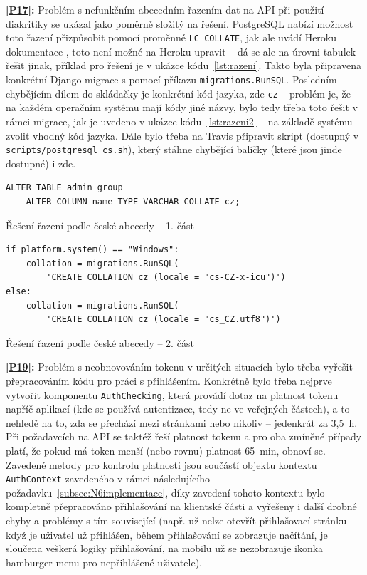 \textbf{\ref{P17}:} Problém s nefunkčním abecedním řazením dat na API při použití diakritiky se ukázal jako poměrně složitý na řešení. PostgreSQL nabízí možnost toto řazení přizpůsobit pomocí proměnné \verb|LC_COLLATE|, jak ale uvádí Heroku dokumentace \cite{heroku-razeni}, toto není možné na Heroku upravit -- dá se ale na úrovni tabulek řešit jinak, příklad pro řešení je v ukázce kódu~\ref{lst:razeni}. Takto byla připravena konkrétní Django migrace s pomocí příkazu \verb|migrations.RunSQL|. Posledním chybějícím dílem do skládačky je konkrétní kód jazyka, zde \verb|cz| -- problém je, že na každém operačním systému mají kódy jiné názvy, bylo tedy třeba toto řešit v rámci migrace, jak je uvedeno v ukázce kódu~\ref{lst:razeni2} -- na základě systému zvolit vhodný kód jazyka. Dále bylo třeba na Travis připravit skript (dostupný v \verb|scripts/postgresql_cs.sh|), který stáhne chybějící balíčky (které jsou jinde dostupné) i zde.

\begin{listing}[ht]
	\begin{verbatim}
ALTER TABLE admin_group
    ALTER COLUMN name TYPE VARCHAR COLLATE cz;
	\end{verbatim}
	\caption{Řešení řazení podle české abecedy -- 1. část}\label{lst:razeni}
\end{listing}

\begin{listing}[ht]
	\begin{verbatim}
if platform.system() == "Windows":
    collation = migrations.RunSQL(
        'CREATE COLLATION cz (locale = "cs-CZ-x-icu")')
else:
    collation = migrations.RunSQL(
        'CREATE COLLATION cz (locale = "cs_CZ.utf8")')
	\end{verbatim}
	\caption{Řešení řazení podle české abecedy -- 2. část}\label{lst:razeni2}
\end{listing}

\textbf{\ref{P19}:} Problém s neobnovováním tokenu v určitých situacích bylo třeba vyřešit přepracováním kódu pro práci s přihlášením. Konkrétně bylo třeba nejprve vytvořit komponentu \verb|AuthChecking|, která provádí dotaz na platnost tokenu napříč aplikací (kde se používá autentizace, tedy ne ve veřejných částech), a to nehledě na to, zda se přechází mezi stránkami nebo nikoliv -- jedenkrát za 3,5~h. Při požadavcích na API se taktéž řeší platnost tokenu a pro oba zmíněné případy platí, že pokud má token menší (nebo rovnu) platnost 65~min, obnoví se. Zavedené metody pro kontrolu platnosti jsou součástí objektu kontextu \verb|AuthContext| zavedeného v rámci následujícího požadavku~\ref{subsec:N6implementace}, díky zavedení tohoto kontextu bylo kompletně přepracováno přihlašování na klientské části a vyřešeny i další drobné chyby a problémy s tím související (např. už nelze otevřít přihlašovací stránku když je uživatel už přihlášen, během přihlašování se zobrazuje načítání, je sloučena veškerá logiky přihlašování, na mobilu už se nezobrazuje ikonka hamburger menu pro nepřihlášené uživatele).

